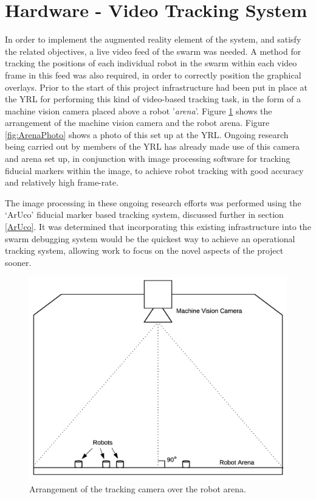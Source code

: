 \section{Hardware - Video Tracking System} \label{TrackingHardware}

In order to implement the augmented reality element of the system, and satisfy the related objectives, a live video feed of the swarm was needed. A method for tracking the positions of each individual robot in the swarm within each video frame in this feed was also required, in order to correctly position the graphical overlays. Prior to the start of this project infrastructure had been put in place at the YRL for performing this kind of video-based tracking task, in the form of a machine vision camera placed above a robot '\textit{arena}'. Figure \ref{fig:CameraLayout} shows the arrangement of the machine vision camera and the robot arena. Figure \ref{fig:ArenaPhoto} shows a photo of this set up at the YRL. Ongoing research being carried out by members of the YRL has already made use of this camera and arena set up, in conjunction with image processing software for tracking fiducial markers within the image, to achieve robot tracking with good accuracy and relatively high frame-rate.

The image processing in these ongoing research efforts was performed using the `ArUco\cite{Garrido:2014}' fiducial marker based tracking system, discussed further in section \ref{ArUco}. It was determined that incorporating this existing infrastructure into the swarm debugging system would be the quickest way to achieve an operational tracking system, allowing work to focus on the novel aspects of the project sooner.

\begin{figure}
	\centering
	\includegraphics[scale=0.3]{Figures/CameraLayout.png}
	\decoRule
	\caption[Tracking Camera Arrangement]{Arrangement of the tracking camera over the robot arena.}
	\label{fig:CameraLayout}
\end{figure}

